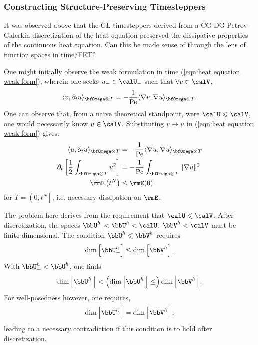 \subsubsection{Constructing Structure-Preserving Timesteppers}
    It was observed above that the GL timesteppers derived from a CG-DG Petrov–Galerkin discretization of the heat equation preserved the dissipative properties of the continuous heat equation. Can this be made sense of through the lens of function spaces in time/FET?

    One might initially observe the weak formulation in time (\ref{eqn:heat equation weak form}), wherein one seeks $u_{-}  \in  \calU_{-}$ such that $\forall  v  \in  \calV$,
    \begin{equation*}
        \langle v, \partial_{t}u\rangle_{\bfOmega\otimes T}  =   - \frac{1}{\rmPe}\langle\nabla v, \nabla u\rangle_{\bfOmega\otimes T}.
    \end{equation*}
    One can observe that, from a naïve theoretical standpoint, were $\calU  \leqslant  \calV$, one would necessarily know $u  \in  \calV$. Substituting $v  \mapsto  u$ in (\ref{eqn:heat equation weak form}) gives:
    \begin{align}
        \langle u, \partial_{t}u\rangle_{\bfOmega\otimes T}  &=   - \frac{1}{\rmPe}\langle\nabla u, \nabla u\rangle_{\bfOmega\otimes T}\label{eqn:heat equation dissipation proof 1}  \\
        \partial_{t}\left[\frac{1}{2}\int_{\bfOmega\otimes T}u^{2}\right]  &=   - \frac{1}{\rmPe}\int_{\bfOmega\otimes T}\|\nabla u\|^{2}  \\
        \rmE\left(t^{N}\right)  &\leq  \rmE(0)\label{eqn:heat equation dissipation proof 3}
    \end{align}
    for $T  =  \left(0, t^{N}\right]$, i.e. necessary dissipation on $\rmE$.
    
    The problem here derives from the requirement that $\calU  \leqslant  \calV$. After discretization, the spaces $\bbU^{h}_{-}  <  \bbU^{h}  <  \calU$, $\bbV^{h}  <  \calV$ must be finite-dimensional. The condition $\bbU^{h}  \leqslant  \bbV^{h}$ requires
    \begin{equation}
        \dim\left[\bbU^{h}_{-}\right]  \leq  \dim\left[\bbV^{h}\right].
    \end{equation}
    With $\bbU^{h}_{-}  <  \bbU^{h}$, one finds
    \begin{equation}
        \dim\left[\bbU^{h}_{-}\right]  <  \left(\dim\left[\bbU^{h}_{-}\right]  \leq\right)  \dim\left[\bbV^{h}\right].
    \end{equation}
    For well-posedness however, one requires,
    \begin{equation}
        \dim\left[\bbU^{h}_{-}\right]  =  \dim\left[\bbV^{h}\right],
    \end{equation}
    leading to a necessary contradiction if this condition is to hold after discretization. \contra


